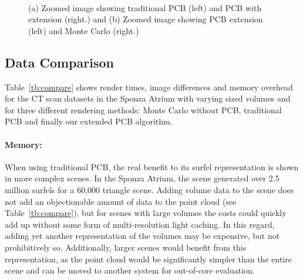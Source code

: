 \documentclass[runningheads]{llncs}
\begin{document}
\begin{figure}
\centering

\\

\caption{(a) Zoomed image showing traditional PCB (left) and PCB with extension (right.) and (b) Zoomed image showing PCB extension (left) and Monte Carlo (right.)}

\end{figure}

\subsection{Data Comparison}

Table~\ref{tb:compare} shows render times, image differences and memory overhead for the CT scan datasets in the Sponza Atrium with varying sized volumes and for three different rendering methods: Monte Carlo without PCB, traditional PCB and finally our extended PCB algorithm.


\paragraph{Memory:}
When using traditional PCB, the real benefit to its surfel representation is shown in more complex scenes.  In the Sponza Atrium, the scene generated over 2.5 million surfels for a 60,000 triangle scene.  Adding volume data to the scene does not add an objectionable amount of data to the point cloud (see Table~\ref{tb:compare}), but for scenes with large volumes the costs could quickly add up without some form of multi-resolution light caching.  In this regard, adding yet another representation of the volumes may be expensive, but not prohibitively so.  Additionally, larger scenes would benefit from this representation, as the point cloud would be significantly simpler than the entire scene and can be moved to another system for out-of-core evaluation.
\end{document}
